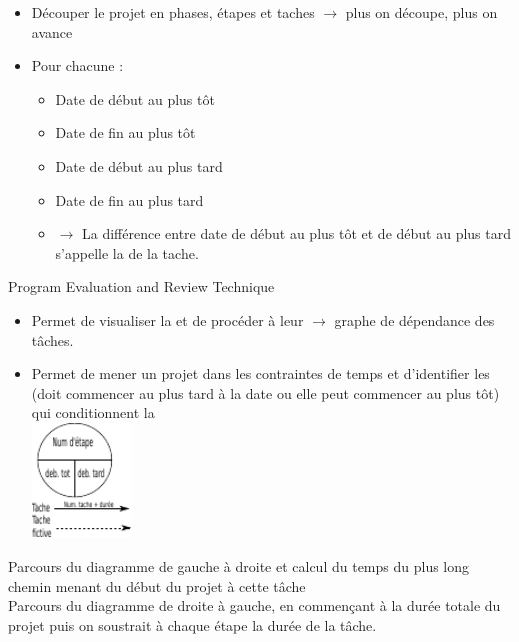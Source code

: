 \begin{itemize}
	\item Découper le projet en phases, étapes et taches $\rightarrow$ plus on découpe, plus on avance
	\item Pour chacune : 
	\begin{itemize}
		\item Date de début au plus tôt
		\item Date de fin au plus tôt
		\item Date de début au plus tard
		\item Date de fin au plus tard
		\item $\rightarrow$ La différence entre date de début au plus tôt et de début au plus tard s'appelle la  de la tache.
	\end{itemize}
\end{itemize}

 Program Evaluation and Review Technique 
\begin{itemize}
	\item Permet de visualiser la  et de procéder à leur  $\rightarrow$ graphe de dépendance des tâches.
	\item Permet de mener un projet dans les contraintes de temps et d'identifier les  (doit commencer au plus tard à la date ou elle peut commencer au plus tôt) qui conditionnent la  \\
	\includegraphics[width=100px]{Images/fig1.pdf} 
\end{itemize}

 Parcours du diagramme de gauche à droite et calcul du temps du plus long chemin menant du début du projet à cette tâche \\

 Parcours du diagramme de droite à gauche, en commençant à la durée totale du projet puis on soustrait à chaque étape la durée de la tâche. \\

